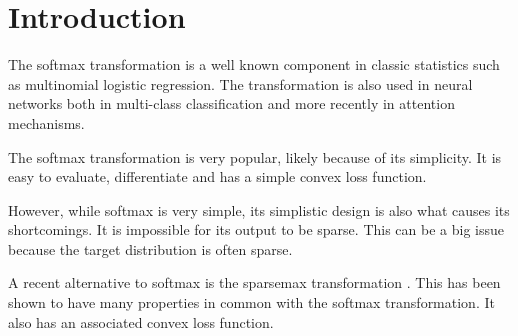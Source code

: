 \section{Introduction}

The softmax transformation is a well known component in classic statistics such as multinomial logistic regression. The transformation is also used in neural networks both in multi-class classification and more recently in attention mechanisms.

The softmax transformation is very popular, likely because of its simplicity. It is easy to evaluate, differentiate and has a simple convex loss function.

However, while softmax is very simple, its simplistic design is also what causes its shortcomings. It is impossible for its output to be sparse. This can be a big issue because the target distribution is often sparse.

A recent alternative to softmax is the sparsemax transformation \cite{sparsemax}. This has been shown to have many properties in common with the softmax transformation. It also has an associated convex loss function.